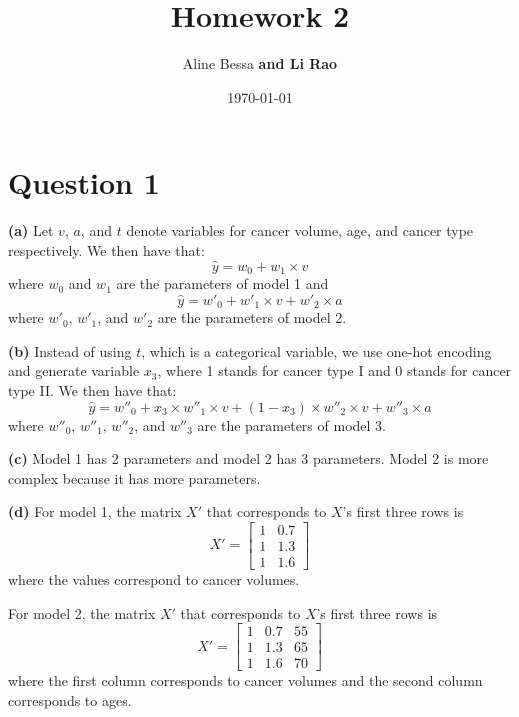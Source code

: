 \documentclass[leqno]{article}
\title{Homework 2}
\author{Aline Bessa \textbf{and Li Rao}}
\date\today
\begin{document}
\maketitle %

\section*{Question 1}

\textbf{(a)} Let $v$, $a$, and $t$ denote variables for cancer volume, age, and cancer type respectively. We then have that:
\begin{equation*}
\hat{y} = w_0 + w_1 \times v
\end{equation*}
where $w_0$ and $w_1$ are the parameters of model 1 and
\begin{equation*}
\hat{y} = w'_0 + w'_1 \times v + w'_2 \times a
\end{equation*}
where $w'_0$, $w'_1$, and $w'_2$ are the parameters of model 2.

\hfill

\textbf{(b)} Instead of using $t$, which is a categorical variable, we use one-hot encoding and generate variable $x_3$, where 1 stands for cancer type I and 
0 stands for cancer type II. We then have that:
\begin{equation*}
\hat{y} = w''_0 + x_3 \times w''_1 \times v + (1 - x_3) \times w''_2 \times v  + w''_3 \times a 
\end{equation*}
where $w''_0$, $w''_1$, $w''_2$, and $w''_3$ are the parameters of model 3.

\hfill

\textbf{(c)} Model 1 has 2 parameters and model 2 has 3 parameters. Model 2 is more complex because it has more parameters.

\hfill

\textbf{(d)} For model 1, the matrix $X'$ that corresponds to $X$'s first three rows is
\[
X'=
  \begin{bmatrix}
    1 & 0.7 \\
    1 & 1.3 \\
    1 & 1.6
  \end{bmatrix}
\]
where the values correspond to cancer volumes.

For model 2, the matrix $X'$ that corresponds to $X$'s first three rows is
\[
X'=
  \begin{bmatrix}
    1 & 0.7 & 55 \\
    1 & 1.3 & 65 \\
    1 & 1.6 & 70
  \end{bmatrix}
\]
where the first column corresponds to cancer volumes and the second column corresponds to ages.
\end{document}
